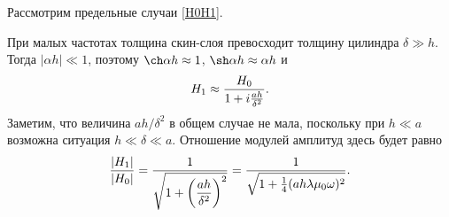%
%


Рассмотрим предельные случаи \eqref{H0H1}.

При малых частотах толщина скин-слоя превосходит толщину цилиндра 
$\delta \gg h$. Тогда $|\alpha h| \ll 1$, 
поэтому $\ch \alpha h \approx 1$, $\sh \alpha h\approx \alpha h$ и
\begin{equation}\eqmark{H1}
H_1 \approx \frac{H_0}{1 + i \frac{a h}{\delta ^2}}.
\end{equation}
Заметим, что величина $ah/\delta^2$ в общем случае не мала, поскольку 
при $h\ll a$ возможна ситуация $h\ll \delta \ll a$.
Отношение модулей амплитуд здесь будет равно
\begin{equation} \eqmark{27}
\frac{|H_1|}{|H_0|} = \frac{1}{\sqrt{1+\left(\dfrac{ah}{\delta^2}\right)^2}} = 
\frac{1}{\sqrt{1+\frac14 (ah \lambda \mu_0 \omega)^2}}.
\end{equation}

